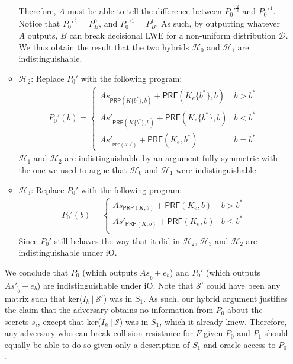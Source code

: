\documentclass{article}
\begin{document}
\begin{itemize}
\begin{itemize}
        Therefore, $A$ must be able to tell the difference between $P_0'^{\frac{2}{3}}$ and $P_0'^{1}$. Notice that $P_0'^{\frac{2}{3}} = P_B^0$, and $P_0'^{1} = P_B^1$. As such, by outputting whatever $A$ outputs, $B$ can break decisional LWE for a non-uniform distribution $\mathcal{D}$. We thus obtain the result that the two hybrids $\mathcal{H}_0$ and $\mathcal{H}_1$ are indistinguishable.
        \item $\mathcal{H}_2$: Replace $P_0'$ with the following program:
        \begin{align}
            P_0'(b) = 
            \begin{cases}
                As_{\textsf{PRP}(K\{b^*\}, b)} + \textsf{PRF}(K_e\{b^*\}, b) & b > b^* \\
                As'_{\textsf{PRP}(K\{b^*\}, b)} + \textsf{PRF}(K_e\{b^*\}, b) & b < b^* \\
                As'_{_{\textsf{PRP}(K, b^*)}} + \textsf{PRF}(K_e, b^*) & b = b^*
            \end{cases}
        \end{align}
        $\mathcal{H}_1$ and $\mathcal{H}_2$ are indistinguishable by an argument fully symmetric with the one we used to argue that $\mathcal{H}_0$ and $\mathcal{H}_1$ were indistinguishable.
        \item $\mathcal{H}_3$: Replace $P_0'$ with the following program:
        \begin{align}
            P_0'(b) = 
            \begin{cases}
                As_{\textsf{PRP}(K, b)} + \textsf{PRF}(K_e, b) & b > b^* \\
                As'_{\textsf{PRP}(K, b)} + \textsf{PRF}(K_e, b) & b \leq b^* \\
            \end{cases}
        \end{align}
        Since $P_0'$ still behaves the way that it did in $\mathcal{H}_2$, $\mathcal{H}_3$ and $\mathcal{H}_2$ are indistinguishable under \textsf{iO}.
    \end{itemize}
    We conclude that $P_0$ (which outputs $As_{\widetilde{b}} + e_{b}$) and $P_0'$ (which outputs $As'_{\widetilde{b}} + e_{b}$) are indistinguishable under \textsf{iO}. Note that $\mathcal{S}'$ could have been any matrix such that ker($I_k \: | \: \mathcal{S}'$) was in $S_1$. As such, our hybrid argument justifies the claim that the adversary obtains no information from $P_0$ about the secrets $s_i$, except that ker($I_k \: | \: \mathcal{S}$) was in $S_1$, which it already knew. Therefore, any adversary who can break collision resistance for $F$ given $P_0$ and $P_1$ should equally be able to do so given only a description of $S_1$ and oracle access to $P_0$.


\end{itemize}
\end{document}

